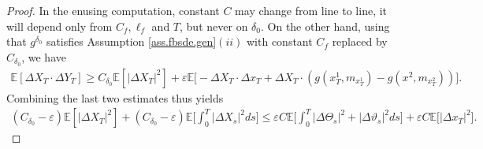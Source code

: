 \documentclass[11pt,reqno]{amsart}
\numberwithin{equation}{section}
\theoremstyle{definition}
\def\E{{\mathbb E}}
\def \E{\mathbb{E}}
\begin{document}
\begin{proof}
  In the enusing computation, constant $C$ may change from line to line, it will depend only from $C_f, \ell_f$ and $T$, but never on $\delta_0$.
  On the other hand, using that $g^{\delta_0}$ satisfies Assumption \ref{ass.fbsde.gen}$(ii)$ with constant $C_f$ replaced by $C_{\delta_0}$, we have
  \begin{align*}
    \E[\Delta X_T\cdot \Delta Y_T] \ge C_{\delta_0}\E[|\Delta X_T|^2] + \varepsilon \E\big[-\Delta X_T\cdot\Delta x_T + \Delta X_T\cdot(g(x^1_T, m_{x^1_T}) - g(x^2,m_{x^2_T})) \big].
  \end{align*}
  Combining the last two estimates thus yields
  \begin{align}
  \label{eq:estim.mono.1}
    (C_{\delta_0} - \varepsilon)\E[|\Delta X_T|^2] + (C_{\delta_0} - \varepsilon)\E\bigg[\int_0^T|\Delta X_s|^2ds\bigg]\le \varepsilon C\E\bigg[\int_0^T|\Delta \Theta_s|^2 + |\Delta \vartheta_s|^2ds \bigg] + \varepsilon C\E\big[|\Delta x_T|^2\big].
  \end{align}

 


\end{proof}
\end{document}
